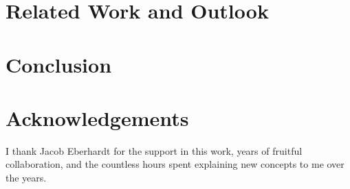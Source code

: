 \documentclass[11pt,a4paper,final]{article}
\begin{document}
    \section{Related Work and Outlook} \label{outlook}
    

    \section{Conclusion}
    

    \section{Acknowledgements}
    I thank Jacob Eberhardt for the support in this work, years of fruitful collaboration, and the countless hours spent explaining new concepts to me over the years. 

    
    
\end{document}

